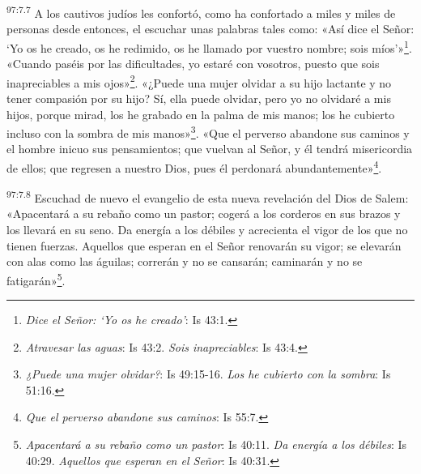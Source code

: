 \par
\textsuperscript{97:7.7} A los cautivos judíos les confortó, como ha confortado a miles y miles de personas desde entonces, el escuchar unas palabras tales como: «Así dice el Señor: `Yo os he creado, os he redimido, os he llamado por vuestro nombre; sois míos'»\footnote{\textit{Dice el Señor: `Yo os he creado'}: Is 43:1.}. «Cuando paséis por las dificultades, yo estaré con vosotros, puesto que sois inapreciables a mis ojos»\footnote{\textit{Atravesar las aguas}: Is 43:2. \textit{Sois inapreciables}: Is 43:4.}. «¿Puede una mujer olvidar a su hijo lactante y no tener compasión por su hijo? Sí, ella puede olvidar, pero yo no olvidaré a mis hijos, porque mirad, los he grabado en la palma de mis manos; los he cubierto incluso con la sombra de mis manos»\footnote{\textit{¿Puede una mujer olvidar?}: Is 49:15-16. \textit{Los he cubierto con la sombra}: Is 51:16.}. «Que el perverso abandone sus caminos y el hombre inicuo sus pensamientos; que vuelvan al Señor, y él tendrá misericordia de ellos; que regresen a nuestro Dios, pues él perdonará abundantemente»\footnote{\textit{Que el perverso abandone sus caminos}: Is 55:7.}.

\par
\textsuperscript{97:7.8} Escuchad de nuevo el evangelio de esta nueva revelación del Dios de Salem: «Apacentará a su rebaño como un pastor; cogerá a los corderos en sus brazos y los llevará en su seno. Da energía a los débiles y acrecienta el vigor de los que no tienen fuerzas. Aquellos que esperan en el Señor renovarán su vigor; se elevarán con alas como las águilas; correrán y no se cansarán; caminarán y no se fatigarán»\footnote{\textit{Apacentará a su rebaño como un pastor}: Is 40:11. \textit{Da energía a los débiles}: Is 40:29. \textit{Aquellos que esperan en el Señor}: Is 40:31.}.

